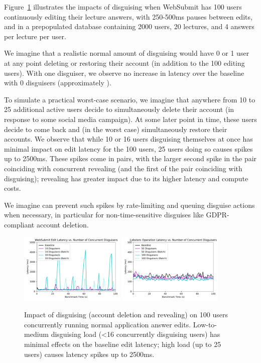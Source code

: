  Figure~\ref{fig:concurrent} illustrates the
impacts of disguising when WebSubmit has 100 users continuously editing their lecture answers, with
250-500ms pauses between edits, and in a prepopulated database containing 2000 users, 20 lectures,
and 4 answers per lecture per user.

We imagine that a realistic normal amount of disguising would have 0 or 1 user at any point deleting
or restoring their account (in addition to the 100 editing users). With one disguiser, we observe no
increase in latency over the baseline with 0 disguisers (approximately ). 

To simulate a practical worst-case scenario, we imagine that anywhere from 10 to 25 additional
active users decide to simultaneously delete their account (\eg in response to some social media
campaign). At some later point in time, these users decide to come back and (in the worst case)
simultaneously restore their accounts. We observe that while 10 or 16 users disguising themselves at once
has minimal impact on edit latency for the 100 users, 25 users doing so causes spikes up to 2500ms.  
%
These spikes come in pairs, with the larger second spike in the pair coinciding with concurrent
revealing (and the first of the pair coinciding with disguising); revealing has greater impact due
to its higher latency and compute costs.

We imagine \sys can prevent such spikes by rate-limiting and queuing disguise actions when
necessary, in particular for non-time-sensitive disguises like GDPR-compliant account deletion.


\begin{figure}[t!]
    \centering
        \includegraphics[width=0.45\textwidth]{figs/websubmit_concurrent_results_20lec_100users}
        \includegraphics[width=0.45\textwidth]{figs/lobsters_concurrent_results}
    \caption{Impact of disguising (account deletion and revealing) on 100 users concurrently running
    normal application answer edits. Low-to-medium disguising load (<16 concurrently disguising users) has
    minimal effects on the baseline edit latency; high load (up to 25 users) causes latency spikes
    up to 2500ms.} 
    \label{fig:concurrent}
\end{figure}
